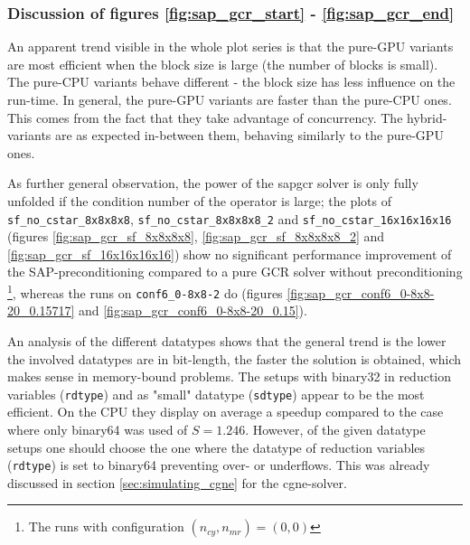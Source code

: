 \documentclass{article}
\theoremstyle{plain} %
\theoremstyle{convention} %
\theoremstyle{remark} %
\def\code#1{\texttt{#1}}
\numberwithin{equation}{section}
\begin{document}
\subsubsection{Discussion of figures \ref{fig:sap_gcr_start} - \ref{fig:sap_gcr_end}}

An apparent trend visible in the whole plot series is that the pure-GPU variants are most efficient when the block size is large (the number of blocks is small). The pure-CPU variants behave different - the block size has less influence on the run-time. In general, the pure-GPU variants are faster than the pure-CPU ones. This comes from the fact that they take advantage of concurrency. The hybrid-variants are as expected in-between them, behaving similarly to the pure-GPU ones.

As further general observation, the power of the \acrshort{sapgcr} solver is only fully unfolded if the condition number of the operator is large; the plots of \code{sf\_no\_cstar\_8x8x8x8}, \code{sf\_no\_cstar\_8x8x8x8\_2} and \code{sf\_no\_cstar\_16x16x16x16} (figures \ref{fig:sap_gcr_sf_8x8x8x8}, \ref{fig:sap_gcr_sf_8x8x8x8_2} and \ref{fig:sap_gcr_sf_16x16x16x16}) show no significant performance improvement of the SAP-preconditioning compared to a pure GCR solver without preconditioning \footnote{The runs with configuration $(n_{cy}, n_{mr}) = (0,0)$}, whereas the runs on \code{conf6\_0-8x8-2} do (figures \ref{fig:sap_gcr_conf6_0-8x8-20_0.15717} and \ref{fig:sap_gcr_conf6_0-8x8-20_0.15}).

An analysis of the different datatypes shows that the general trend is the lower the involved datatypes are in bit-length, the faster the solution is obtained, which makes sense in memory-bound problems. The setups with \gls{binary32} in reduction variables (\code{rdtype}) and as "small" datatype (\code{sdtype}) appear to be the most efficient. On the CPU they display on average a speedup compared to the case where only \gls{binary64} was used of $S = 1.246$. However, of the given datatype setups one should choose the one where the datatype of reduction variables (\code{rdtype}) is set to \gls{binary64} preventing over- or underflows. This was already discussed in section \ref{sec:simulating_cgne} for the \acrshort{cgne}-solver.
\end{document}
